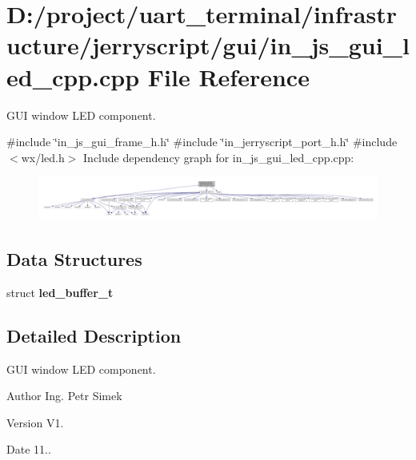 \section{D\+:/project/uart\+\_\+terminal/infrastructure/jerryscript/gui/in\+\_\+js\+\_\+gui\+\_\+led\+\_\+cpp.cpp File Reference}
\label{in__js__gui__led__cpp_8cpp}


G\+UI window L\+ED component.  


{\ttfamily \#include \char`\"{}in\+\_\+js\+\_\+gui\+\_\+frame\+\_\+h.\+h\char`\"{}}\newline
{\ttfamily \#include \char`\"{}in\+\_\+jerryscript\+\_\+port\+\_\+h.\+h\char`\"{}}\newline
{\ttfamily \#include $<$wx/led.\+h$>$}\newline
Include dependency graph for in\+\_\+js\+\_\+gui\+\_\+led\+\_\+cpp.\+cpp\+:
\nopagebreak
\begin{figure}[H]
\begin{center}
\leavevmode
\includegraphics[width=350pt]{in__js__gui__led__cpp_8cpp__incl}
\end{center}
\end{figure}
\subsection*{Data Structures}
\begin{DoxyCompactItemize}
\item 
struct \textbf{ led\+\_\+buffer\+\_\+t}
\end{DoxyCompactItemize}


\subsection{Detailed Description}
G\+UI window L\+ED component. 

\begin{DoxyAuthor}{Author}
Ing. Petr Simek 
\end{DoxyAuthor}
\begin{DoxyVersion}{Version}
V1. 
\end{DoxyVersion}
\begin{DoxyDate}{Date}
11.. 
\end{DoxyDate}
